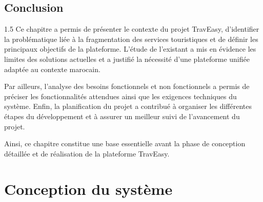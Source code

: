 \documentclass[a4paper,12pt]{report}
\begin{document}


\section{Conclusion}
\vspace{0.5cm}
\begin{spacing}{1.5}
\justifying
Ce chapitre a permis de présenter le contexte du projet TravEasy, d'identifier la problématique liée à la fragmentation des services touristiques et de définir les principaux objectifs de la plateforme. L'étude de l'existant a mis en évidence les limites des solutions actuelles et a justifié la nécessité d'une plateforme unifiée adaptée au contexte marocain.

Par ailleurs, l'analyse des besoins fonctionnels et non fonctionnels a permis de préciser les fonctionnalités attendues ainsi que les exigences techniques du système. Enfin, la planification du projet a contribué à organiser les différentes étapes du développement et à assurer un meilleur suivi de l'avancement du projet.

Ainsi, ce chapitre constitue une base essentielle avant la phase de conception détaillée et de réalisation de la plateforme TravEasy.

\end{spacing}

\newpage
\chapter{ Conception du système}
\end{document}
